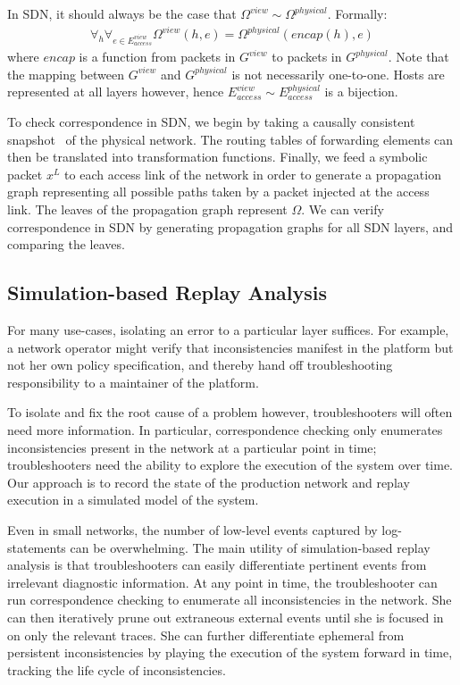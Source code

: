 In SDN, it should always be the case that 
$\Omega^{view} \sim \Omega^{physical}$. 
Formally:
\begin{align*}
\forall_{h} \forall_{e \in E_{access}^{view}} \Omega^{view}(h,e) =
\Omega^{physical}(encap(h),e) 
\end{align*}
where $encap$ is a function from packets in $G^{view}$ to packets in
$G^{physical}$. Note that the mapping between $G^{view}$ and $G^{physical}$ is not
necessarily one-to-one. Hosts are represented at all layers however, hence
$E_{access}^{view} \sim E_{access}^{physical}$ is a bijection.

To check correspondence in SDN, we begin by taking a causally consistent
snapshot~\cite{Chandy:1985:DSD:214451.214456} of the physical network. The routing
tables of forwarding elements can then be translated into transformation functions.
Finally, we feed a symbolic packet $x^L$ to each access link of the network in
order to generate
a propagation graph representing all possible paths taken by a packet injected
at the access link. The leaves of the propagation graph represent $\Omega$. We
can verify correspondence in SDN by generating propagation graphs for all SDN layers,
and comparing the leaves.

\subsection{Simulation-based Replay Analysis}

For many use-cases, isolating an error to a particular layer suffices.
For example, a network operator might verify that inconsistencies manifest in
the platform but not her own policy specification, and thereby hand off
troubleshooting responsibility to a maintainer of the platform. 

To isolate and fix the root cause of a problem however, troubleshooters will often
need more information. In particular, correspondence checking only enumerates
inconsistencies present in the network at a particular point in time;
troubleshooters need the ability to explore the execution of the system over
time. Our approach is to record the state of the production network and replay 
execution in a simulated model of the system.

Even in small networks,
the number of low-level events captured by
log-statements can be overwhelming. The main utility of simulation-based replay
analysis is that troubleshooters can easily differentiate pertinent events from
irrelevant diagnostic information. At any point in time, the troubleshooter
can run correspondence checking to enumerate all inconsistencies in the
network. She can then iteratively prune out extraneous external events until
she is focused in on only the relevant traces. She can further differentiate
ephemeral from persistent inconsistencies by playing the execution of the
system forward in time, tracking the life cycle of inconsistencies.

